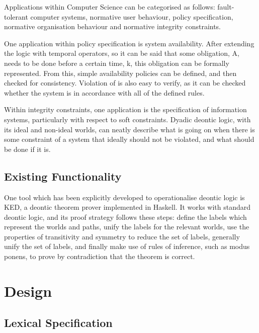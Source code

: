 \documentclass{l4proj}
\begin{document}
Applications within Computer Science can be categorised as follows\cite{meyer93applications}: fault-tolerant computer systems, normative user behaviour, policy specification, normative organisation behaviour and normative integrity constraints. %

One application within policy specification is system availability\cite{brunel04deontic}. After extending the logic with temporal operators, so it can be said that some obligation, A, needs to be done before a certain time, k, this obligation can be formally represented. From this, simple availability policies can be defined, and then checked for consistency. Violation of is also easy to verify, as it can be checked whether the system is in accordance with all of the defined rules. 

Within integrity constraints, one application is the specification of information systems\cite{infosystems}, particularly with respect to soft constraints. Dyadic deontic logic, with its ideal and non-ideal worlds, can neatly describe what is going on when there is some constraint of a system that ideally should not be violated, and what should be done if it is. 

\section{Existing Functionality}
One tool which has been explicitly developed to operationalise deontic logic is KED\cite{KED}, a deontic theorem prover implemented in Haskell. It works with standard deontic logic, and its proof strategy follows these steps: define the labels which represent the worlds and paths, unify the labels for the relevant worlds, use the properties of transitivity and symmetry to reduce the set of labels, generally unify the set of labels, and finally make use of rules of inference, such as modus ponens, to prove by contradiction that the theorem is correct. 


\chapter{Design}

\section{Lexical Specification}
\end{document}
